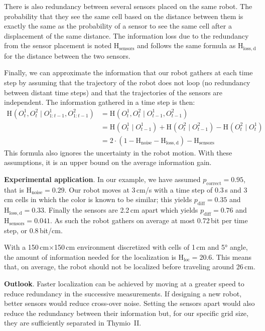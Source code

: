 \documentclass{svmult}
\newcommand{\ent}[1]{\mathrm{H}_\mathrm{#1}} %
\begin{document}
There is also redundancy between several sensors placed on the same robot.
The probability that they see the same cell based on the distance between them is exactly the same as the probability of a sensor to see the same cell after a displacement of the same distance.
The information loss due to the redundancy from the sensor placement is noted $\ent{sensors}$ and follows the same formula as $\ent{loss,d}$ for the distance between the two sensors.

Finally, we can approximate the information that our robot gathers at each time step by assuming that the trajectory of the robot does not loop (no redundancy between distant time steps) and that the trajectories of the sensors are independent. 
The information gathered in a time step is then:
\begin{equation}
\begin{split}
	\ent{}(O^1_t, O^2_t \mid O^1_{1:t-1}, O^2_{1:t-1}) &= \ent{}(O^1_t, O^2_t \mid O^1_{t-1}, O^2_{t-1}) \\
	&= \ent{}(O^1_t \mid O^1_{t-1}) + \ent{}(O^2_t \mid O^2_{t-1}) - \ent{}(O^2_t \mid O^1_t) \\
	&= 2\cdot(1-\ent{noise}-\ent{loss,d}) - \ent{sensors}%
\end{split}
\end{equation}
This formula also ignores the uncertainty in the robot motion.
With these assumptions, it is an upper bound on the average information gain.

\textbf{Experimental application}. In our example, we have assumed $p_\mathrm{correct}=0.95$, that is $\ent{noise}=0.29$.
Our robot moves at 3\,cm/s with a time step of 0.3\,s and 3\,cm cells in which the color is known to be similar; this yields $p_\mathrm{diff}=0.35$ and $\ent{loss,d}=0.33$.
Finally the sensors are 2.2\,cm apart which yields $p_\mathrm{diff}=0.76$ and $\ent{sensors}=0.041$.
As such the robot gathers on average at most 0.72\,bit per time step, or 0.8\,bit/cm.

With a 150\,cm$\times$150\,cm environment discretized with cells of 1\,cm and 5° angle, the amount of information needed for the localization is $\ent{loc}=20.6$.
This means that, on average, the robot should not be localized before traveling around 26\,cm.

\textbf{Outlook}. Faster localization can be achieved by moving at a greater speed to reduce redundancy in the successive measurements.
If designing a new robot, better sensors would reduce cross-over noise.
Setting the sensors apart would also reduce the redundancy between their information but, for our specific grid size, they are sufficiently separated in Thymio~II.
\end{document}
